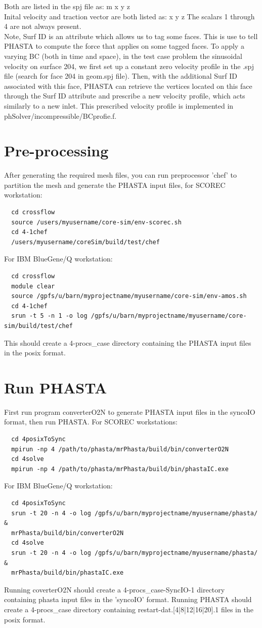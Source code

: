 \documentclass{article}
\begin{document}
   Both are listed in the spj file as: m x y z \\
   Inital velocity and traction vector are both listed as: x y z
   The scalars 1 through 4 are not always present. \\
Note, Surf ID is an attribute which allows us to tag some faces. This is use to tell PHASTA to compute the force that applies on some tagged faces.
To apply a varying BC (both in time and space), in the test case problem the sinusoidal velocity on surface 204, we first set up a constant zero velocity profile in the .spj file (search for face 204 in geom.spj file). Then, with the additional Surf ID associated with this face, PHASTA can retrieve the vertices located on this face through the Surf ID attribute and prescribe a new velocity profile, which acts similarly to a new inlet. This prescribed velocity profile is implemented in phSolver/incompressible/BCprofie.f.

\section{Pre-processing}
After generating the required mesh files, you can run preprocessor 'chef' to partition the mesh and generate the PHASTA input files, for SCOREC workstation:
  \begin{lstlisting}
  cd crossflow
  source /users/myusername/core-sim/env-scorec.sh
  cd 4-1chef
  /users/myusername/coreSim/build/test/chef 
  \end{lstlisting}
For IBM BlueGene/Q workstation:
  \begin{lstlisting}
  cd crossflow
  module clear
  source /gpfs/u/barn/myprojectname/myusername/core-sim/env-amos.sh
  cd 4-1chef
  srun -t 5 -n 1 -o log /gpfs/u/barn/myprojectname/myusername/core-sim/build/test/chef
  \end{lstlisting}

This should create a 4-procs\_case directory containing the PHASTA input files in the posix format.

\section{Run PHASTA}

First run program converterO2N to generate PHASTA input files in the syncoIO format, then run PHASTA. For SCOREC workstations: 
  \begin{lstlisting}
  cd 4posixToSync
  mpirun -np 4 /path/to/phasta/mrPhasta/build/bin/converterO2N 
  cd 4solve
  mpirun -np 4 /path/to/phasta/mrPhasta/build/bin/phastaIC.exe 
  \end{lstlisting}
For IBM BlueGene/Q workstation:
  \begin{lstlisting}
  cd 4posixToSync
  srun -t 20 -n 4 -o log /gpfs/u/barn/myprojectname/myusername/phasta/ &  
  mrPhasta/build/bin/converterO2N
  cd 4solve
  srun -t 20 -n 4 -o log /gpfs/u/barn/myprojectname/myusername/phasta/ &
  mrPhasta/build/bin/phastaIC.exe
  \end{lstlisting}
Running coverterO2N should create a 4-procs\_case-SyncIO-1 directory containing phasta input files in the 'syncoIO' format.
Running PHASTA should create a 4-procs\_case directory containing restart-dat.[4|8|12|16|20].1 files in the posix format.
\end{document}
